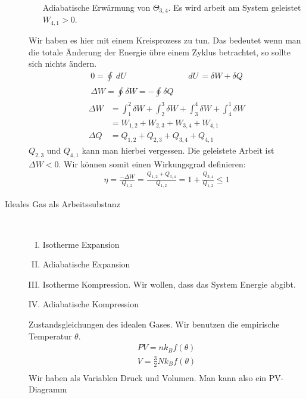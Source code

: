 \documentclass[11pt]{article}
\theoremstyle{plain}
\theoremstyle{mytheoremstyle}
\renewcommand{\d}[1]{\,d#1\,}
\begin{document}
\begin{description}
\begin{enumerate}[I)]
        Adiabatische Erw\"armung von $\Theta_{3,4}$. Es wird arbeit
        am System geleistet $W_{4,1} > 0$.
    \end{enumerate}
    Wir haben es hier mit einem Kreisprozess zu tun. Das bedeutet wenn man die totale
    \"Anderung der Energie \"ubre einem Zyklus betrachtet, so sollte sich nichts
    \"andern.
    \begin{align*}
      0 = \oint_{}^{} \d{U}  && \d{U} = \delta W + \delta Q \\
      \Delta W = \oint_{}^{} \delta W = - \oint_{}^{} \delta Q
    \end{align*}
    \begin{align*}
      \Delta W  & = \int_{1}^{2} \delta W + \int_{2}^{3} \delta W + 
      \int_{3}^{4} \delta W + \int_{4}^{1} \delta W  \\ & = W_{1,2} +W_{2,3} +W_{3,4} +W_{4,1}  \\
      \Delta Q & = Q_{1,2} + Q_{2,3} + Q_{3,4} + Q_{4,1}
    \end{align*}
    $Q_{2,3}$ und $Q_{4,1}$ kann man hierbei vergessen. Die geleistete Arbeit
    ist  $\Delta W < 0$. Wir k\"onnen somit einen Wirkungsgrad definieren:
    \begin{align*}
      \eta = \frac{-\Delta W}{Q_{1,2}} = \frac{Q_{1,2} + Q_{3,4}}{Q_{1,2}}
      = 1 + \frac{Q_{3,4}}{Q_{1,2}} \le 1
    \end{align*}
  \item[Ideales Gas als Arbeitssubstanz] $ $ \\
    \begin{enumerate}[I)]
      \item Isotherme Expansion
      \item Adiabatische Expansion
      \item Isotherme Kompression. Wir wollen, dass das System Energie abgibt.
      \item Adiabatische Kompression
    \end{enumerate} 
    Zustandsgleichungen des idealen Gases. Wir benutzen die empirische Temperatur $\theta$.
    \begin{align*}
      P V = n k_B f(\theta) \\
      V = \frac{3}{2} N k_B f(\theta) \\
    \end{align*}
    Wir haben als Variablen Druck und Volumen. Man kann also ein PV-Diagramm

\end{description}
\end{document}
